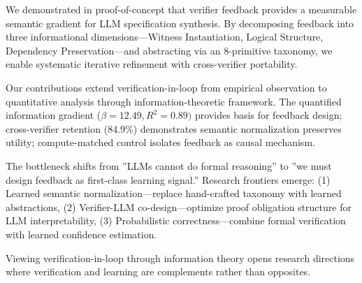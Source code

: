 
We demonstrated in proof-of-concept that verifier feedback provides a measurable semantic gradient for LLM specification synthesis. By decomposing feedback into three informational dimensions---Witness Instantiation, Logical Structure, Dependency Preservation---and abstracting via an 8-primitive taxonomy, we enable systematic iterative refinement with cross-verifier portability.

Our contributions extend verification-in-loop from empirical observation to quantitative analysis through information-theoretic framework. The quantified information gradient ($\beta =12.49, R^{2}=0.89)$ provides basis for feedback design; cross-verifier retention (84.9\%) demonstrates semantic normalization preserves utility; compute-matched control isolates feedback as causal mechanism.

The bottleneck shifts from ''LLMs cannot do formal reasoning'' to ''we must design feedback as first-class learning signal.'' Research frontiers emerge: (1) Learned semantic normalization---replace hand-crafted taxonomy with learned abstractions, (2) Verifier-LLM co-design---optimize proof obligation structure for LLM interpretability, (3) Probabilistic correctness---combine formal verification with learned confidence estimation.

Viewing verification-in-loop through information theory opens research directions where verification and learning are complements rather than opposites.

